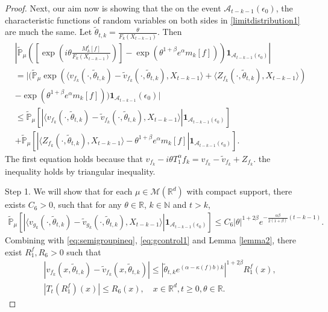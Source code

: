 \documentclass[12pt,oneside,english]{amsart}
\theoremstyle{plain}
\theoremstyle{definition}
\numberwithin{equation}{section}
\begin{document}
\begin{proof}
    Next, our aim now is showing that the on the event $\mathcal{A}_{t-k-1}(\epsilon_0)$, the characteristic functions of random variables on both sides in \eqref{limitdistribution1} are much the same. Let $\tilde{\theta}_{t,k}=\frac{\theta}{F_k(X_{t-k-1})}$. Then
    \begin{align*}
        &\left|\mathbb{\tilde{P}}_{\mu}\left([\exp(i\theta \frac {M_k^t[f]}{F_k(X_{t-k-1})})]-\exp(\theta^{1+\beta}e^{\alpha}m_k[f])\right)\mathbf{1}_{\mathcal{A}_{t-k-1}(\epsilon_0)}\right|\\
        &=\bigg|\big(\mathbb{\tilde{P}}_{\mu}\exp(\langle v_{f_k}(\cdot,\tilde{\theta}_{t,k})-\tilde{v}_{f_k}(\cdot, \tilde{\theta}_{t,k}),X_{t-k-1}\rangle+\langle Z_{f_k}(\cdot,\tilde{\theta}_{t,k}),X_{t-k-1}\rangle)\\
        &-\exp(\theta^{1+\beta}e^{\alpha}m_k[f])\big)\mathbf{1}_{\mathcal{A}_{t-k-1}}(\epsilon_0)\bigg|\\
        &\leq \mathbb{\tilde{P}}_{\mu}\left[\left|\langle v_{f_k}(\cdot,\tilde{\theta}_{t,k})-\tilde{v}_{f_k}(\cdot,\tilde{\theta}_{t,k}), X_{t-k-1}\rangle\right|\mathbf{1}_{\mathcal{A}_{t-k-1}(\epsilon_0)}\right]\\
        &+\mathbb{\tilde{P}}_{\mu}\left[\left|\langle Z_{f_k}(\cdot,\tilde{\theta}_{t,k}),X_{t-k-1}\rangle-\theta^{1+\beta}e^{\alpha}m_k[f]\right|\mathbf{1}_{\mathcal{A}_{t-k-1}(\epsilon_0)}\right].
    \end{align*}
    The first equation holds because that $v_{f_k}-i\theta T_1^{\alpha}f_k=v_{f_k}-\tilde{v}_{f_k}+Z_{f_k}$. the inequality holds by triangular inequality.

Step 1.  We will show that for each $\mu \in\mathcal{M}(\mathbb{R}^d)$ with compact support, there exists $C_6>0$, such that for any $\theta\in \mathbb{R}$, $k\in\mathbb{N}$ and $t>k$,
    \begin{align}
    \label{lemma31q}  
        \mathbb{\tilde{P}}_{\mu}\left[\left|\langle v_{g_k}(\cdot,\tilde{\theta}_{t,k})-\tilde{v}_{g_k}(\cdot,\tilde{\theta}_{t,k}), X_{t-k-1}\rangle\right|\mathbf{1}_{\mathcal{A}_{t-k-1}(\epsilon_0)}\right]\leq C_6|\theta|^{1+2\beta}e^{-\frac{\alpha\beta}{2(1+\beta)}(t-k-1)}.
    \end{align}
Combining with \eqref{eq:semigroupineq}, \eqref{eq:gcontrol1} and Lemma \ref{lemma2}, there exist $R_1^f,R_6>0$ such that
\begin{align}
    & |v_{f_k}(x,\tilde{\theta}_{t,k})-\tilde{v}_{f_k}(x,\tilde{\theta}_{t,k})|\leq |\tilde{\theta}_{t,k} e^{(\alpha-\kappa(f) b)k}|^{1+2\beta}R^f_1(x),\\
    & |T_t (R^f_1)(x)|\leq R_6(x), \quad x\in \mathbb{R}^d,t\geq 0, \theta \in \mathbb{R}.
\end{align}


\end{proof}
\end{document}
